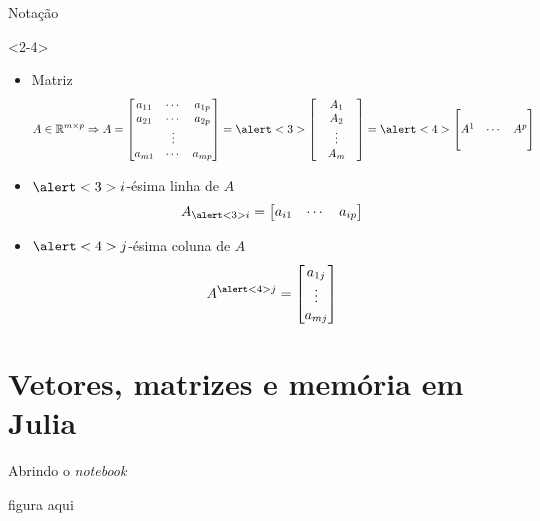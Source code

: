 \documentclass[]{beamer}
\newcommand{\R}{\mathbb{R}}
\begin{document}
\begin{frame}{Notação}
  \begin{onlyenv}<2-4>
    \begin{itemize}
    \item Matriz
      \[
      A \in \R^{m \times p} \Rightarrow A =
      \begin{bmatrix}
        a_{11} & \cdots & a_{1p}\\
        a_{21} & \cdots & a_{2p}\\
        & \vdots & \\
        a_{m1} & \cdots & a_{mp}
      \end{bmatrix}
      =
      \alert<3>{
        \begin{bmatrix}
          & A_1 & \\
          & A_2 & \\
          & \vdots & \\
          & A_m &
        \end{bmatrix} 
      }
      =
      \alert<4>{
        \begin{bmatrix}
          & & \\
          A^1 & \cdots & A^p \\
          &  &
        \end{bmatrix}
      }      
      \]
    \item $\alert<3>{i}$-ésima linha de $A$
      \[
      A_{\alert<3>{i}} =
      \begin{bmatrix}
        a_{i1} & \cdots & a_{ip}
      \end{bmatrix}
      \]
    \item $\alert<4>{j}$-ésima coluna de $A$
      \[
      A^{\alert<4>{j}} =
      \begin{bmatrix}
        a_{1j}\\ \vdots\\ a_{mj}
      \end{bmatrix}
      \]
    \end{itemize}
  \end{onlyenv}

\end{frame}

\section{Vetores, matrizes e memória em Julia}

\begin{frame}{Abrindo o \textit{notebook}}

figura aqui
  
\end{frame}
\end{document}
